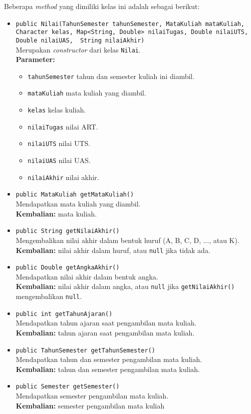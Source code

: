Beberapa \textit{method} yang dimiliki kelas ini adalah sebagai berikut:
\begin{itemize}
	\item \texttt{public Nilai(TahunSemester tahunSemester, MataKuliah mataKuliah, Character kelas, Map<String, Double> nilaiTugas, Double nilaiUTS, Double nilaiUAS, ~String nilaiAkhir)}\\
	Merupakan \textit{constructor} dari kelas \texttt{Nilai}.\\
	\textbf{Parameter:}
	\begin{itemize}
		\item \texttt{tahunSemester} tahun dan semester kuliah ini diambil.
		\item \texttt{mataKuliah} mata kuliah yang diambil.
		\item \texttt{kelas} kelas kuliah.
		\item \texttt{nilaiTugas} nilai ART.
		\item \texttt{nilaiUTS} nilai UTS.
		\item \texttt{nilaiUAS} nilai UAS.
		\item \texttt{nilaiAkhir} nilai akhir.
	\end{itemize}
		
	\item \texttt{public MataKuliah getMataKuliah()}\\
	Mendapatkan mata kuliah yang diambil.\\
	\textbf{Kembalian:} mata kuliah.
	
	\item \texttt{public String getNilaiAkhir()}\\
	Mengembalikan nilai akhir dalam bentuk huruf (A, B, C, D, ..., atau K).\\
	\textbf{Kembalian:} nilai akhir dalam huruf, atau \texttt{null} jika tidak ada.
	
	\item \texttt{public Double getAngkaAkhir()}\\
	Mendapatkan nilai akhir dalam bentuk angka.\\
	\textbf{Kembalian:}  nilai akhir dalam angka, atau \texttt{null} jika \texttt{getNilaiAkhir()} mengembalikan \texttt{null}.
	
	\item \texttt{public int getTahunAjaran()}\\
	Mendapatkan tahun ajaran saat pengambilan mata kuliah.\\
	\textbf{Kembalian:} tahun ajaran saat pengambilan mata kuliah.

    \item \texttt{public TahunSemester getTahunSemester()}\\
	Mendapatkan tahun dan semester pengambilan mata kuliah.\\
	\textbf{Kembalian:} tahun dan semester pengambilan mata kuliah.	
	
	\item \texttt{public Semester getSemester()}\\
	Mendapatkan semester pengambilan mata kuliah.\\
	\textbf{Kembalian:} semester pengambilan mata kuliah
	
\end{itemize}

